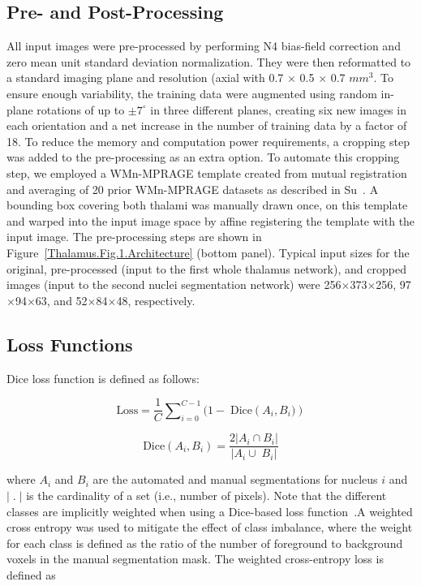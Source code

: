 \subsection{Pre- and Post-Processing}
All input images were pre-processed by performing N4 bias-field correction and zero mean unit standard deviation normalization. They were then reformatted to a standard imaging plane and resolution (axial with 0.7 $\times$ 0.5 $\times$ 0.7 $mm^3$. To ensure enough variability, the training data were augmented using random in-plane rotations of up to $\pm7^\circ $ in three different planes, creating six new images in each orientation and a net increase in the number of training data by a factor of 18. To reduce the memory and computation power requirements, a cropping step was added to the pre-processing as an extra option. To automate this cropping step, we employed a WMn-MPRAGE template created from mutual registration and averaging of 20 prior WMn-MPRAGE datasets as described in Su~\cite{su_Thalamus_2019}. A bounding box covering both thalami was manually drawn once, on this template and warped into the input image space by affine registering the template with the input image. The pre-processing steps are shown in Figure~\ref{Thalamus.Fig.1.Architecture}  (bottom panel). Typical input sizes for the original, pre-processed (input to the first whole thalamus network), and cropped images (input to the second nuclei segmentation network) were 256$\times$373$\times$256, 97$\times$94$\times$63, and 52$\times$84$\times$48, respectively.

\subsection{Loss Functions}

Dice loss function is defined as follows:

\begin{equation}
\label{eq:thalamus.eq.1.lossdice}
\text{Loss} = \frac{1}{C}{\sum\nolimits_{i=0}^{C-1}{(1-\;\text{Dice}\left(A_i,B_i)\right)}}
\end{equation}



\begin{equation}
\label{eq:thalamus.eq.2.dice}
\text{Dice}\left(A_i,B_i\right) = \frac{2\left\vert A_i\cap B_i\right\vert}{\left\vert A_i\cup\;B_i\right\vert}
\end{equation}

where $A_i $ and $B_i $ are the automated and manual segmentations for nucleus $i $ and $\vert\;.\;\vert $ is the cardinality of a set (i.e., number of pixels). Note that the different classes are implicitly weighted when using a Dice-based loss function~\cite{crum_Generalized_2006,drozdzal_Importance_2016}.A weighted cross entropy was used to mitigate the effect of class imbalance, where the weight for each class is defined as the ratio of the number of foreground to background voxels in the manual segmentation mask. The weighted cross-entropy loss is defined as

